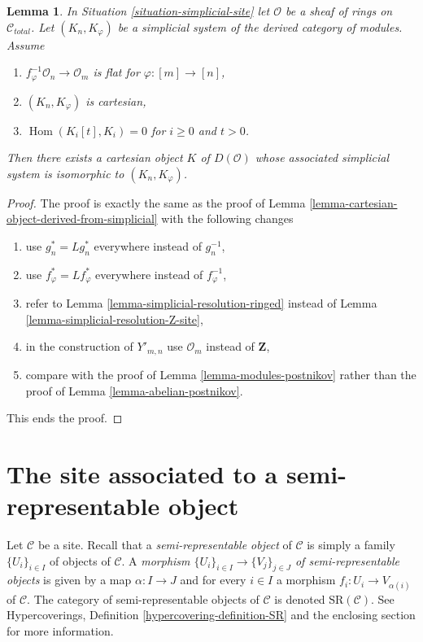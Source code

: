 \documentclass{stacks-project}
\theoremstyle{plain}
\newtheorem{lemma}[subsection]{Lemma}
\theoremstyle{definition}
\theoremstyle{remark}
\numberwithin{equation}{subsection}
\def\Hom{\mathop{\mathrm{Hom}}\nolimits}
\begin{document}
\begin{lemma}
\label{lemma-cartesian-module-derived-from-simplicial}
In Situation \ref{situation-simplicial-site} let $\mathcal{O}$ be
a sheaf of rings on $\mathcal{C}_{total}$. Let
$(K_n, K_\varphi)$ be a simplicial system of the derived category
of modules. Assume
\begin{enumerate}
\item $f_\varphi^{-1}\mathcal{O}_n \to \mathcal{O}_m$ is flat for
$\varphi : [m] \to [n]$,
\item $(K_n, K_\varphi)$ is cartesian,
\item $\Hom(K_i[t], K_i) = 0$ for $i \geq 0$ and $t > 0$.
\end{enumerate}
Then there exists a cartesian object $K$ of $D(\mathcal{O})$
whose associated simplicial system is isomorphic to $(K_n, K_\varphi)$.
\end{lemma}

\begin{proof}
The proof is exactly the same as the proof of
Lemma \ref{lemma-cartesian-object-derived-from-simplicial}
with the following changes
\begin{enumerate}
\item use $g_n^* = Lg_n^*$ everywhere instead of $g_n^{-1}$,
\item use $f_\varphi^* = Lf_\varphi^*$ everywhere instead of $f_\varphi^{-1}$,
\item refer to Lemma \ref{lemma-simplicial-resolution-ringed}
instead of Lemma \ref{lemma-simplicial-resolution-Z-site},
\item in the construction of $Y'_{m, n}$ use
$\mathcal{O}_m$ instead of $\mathbf{Z}$,
\item compare with the proof of Lemma \ref{lemma-modules-postnikov}
rather than the proof of Lemma \ref{lemma-abelian-postnikov}.
\end{enumerate}
This ends the proof.
\end{proof}







\section{The site associated to a semi-representable object}
\label{section-semi-representable}

\noindent
Let $\mathcal{C}$ be a site. Recall that a {\it semi-representable object}
of $\mathcal{C}$ is simply a family $\{U_i\}_{i \in I}$
of objects of $\mathcal{C}$. A
{\it morphism $\{U_i\}_{i \in I} \to \{V_j\}_{j \in J}$ of
semi-representable objects} is given by a map $\alpha : I \to J$
and for every $i \in I$ a morphism $f_i : U_i \to V_{\alpha(i)}$
of $\mathcal{C}$.
The category of semi-representable objects of $\mathcal{C}$
is denoted $\text{SR}(\mathcal{C})$.
See Hypercoverings, Definition \ref{hypercovering-definition-SR}
and the enclosing section for more information.
\end{document}
